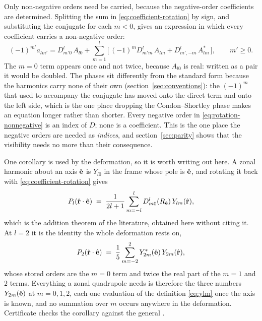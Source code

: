 Only non-negative orders need be carried, because the negative-order coefficients are
determined.  Splitting the sum in \eqref{eq:coefficient-rotation} by sign, and substituting
the conjugate for each $m < 0$, gives an expression in which every coefficient carries a
non-negative order:
\begin{equation}
  (-1)^{m'} a_{lm'} = D^l_{m'0} \, A_{l0}
  + \sum_{m=1}^{l} \Big[ \, (-1)^m D^l_{m'm} \, A_{lm}
  + D^l_{m',-m} \, A_{lm}^* \, \Big] ,
  \qquad m' \ge 0 .
  \label{eq:rotation-nonnegative}
\end{equation}
The $m = 0$ term appears once and not twice, because $A_{l0}$ is real: written as a pair it
would be doubled.  The phases sit differently from the standard form because the harmonics
carry none of their own (section~\ref{sec:conventions}): the $(-1)^m$ that used to accompany
the conjugate has moved onto the direct term and onto the left side, which is the one place
dropping the Condon--Shortley phase makes an equation longer rather than shorter.  Every negative order in \eqref{eq:rotation-nonnegative} is an index of
$D$; none is a coefficient.  This is the one place the negative orders are needed as
\emph{indices}, and section~\ref{sec:parity} shows that the visibility needs no more than
their consequence.

One corollary is used by the deformation, so it is worth writing out here.  A zonal harmonic
about an axis $\hat{\mathbf e}$ is $Y_{l0}$ in the frame whose pole is $\hat{\mathbf e}$, and rotating it back
with \eqref{eq:coefficient-rotation} gives
\begin{equation}
  P_l(\hat{\mathbf r}\cdot\hat{\mathbf e}) \;=\; \frac{1}{2l+1}
    \sum_{m=-l}^{l} D^l_{m0}(R_{\hat{\mathbf e}})\,Y_{lm}(\hat{\mathbf r}) ,
  \label{eq:zonal-in-d}
\end{equation}
which is the addition theorem of the literature, obtained here without citing it.  At $l = 2$
it is the identity the whole deformation rests on,
\begin{equation}
  P_2(\hat{\mathbf r}\cdot\hat{\mathbf e}) \;=\; \frac{1}{5}\sum_{m=-2}^{2}
    Y_{2m}^*(\hat{\mathbf e})\,Y_{2m}(\hat{\mathbf r}) ,
  \label{eq:zonal-l2}
\end{equation}
whose stored orders are the $m = 0$ term and twice the real part of the $m = 1$ and $2$ terms.
Everything a zonal quadrupole needs is therefore the three numbers $Y_{2m}(\hat{\mathbf e})$ at
$m = 0, 1, 2$, each one evaluation of the definition \eqref{eq:ylm} once the axis is known, and
no summation over $m$ occurs anywhere in the deformation.  Certificate  checks the
corollary against the general .

